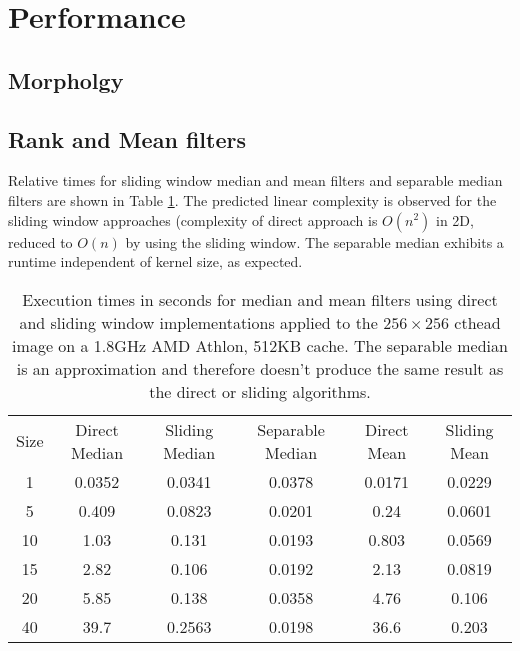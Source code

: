 \documentclass{InsightArticle}
\begin{document}
\section{Performance}
\subsection{Morpholgy}


\subsection{Rank and Mean filters}
Relative times for sliding window median and mean filters and
separable median filters are shown in Table \ref{tab:perfRank}. The
predicted linear complexity is observed for the sliding window
approaches (complexity of direct approach is $O(n^2)$ in 2D, reduced
to $O(n)$ by using the sliding window. The separable median exhibits a
runtime independent of kernel size, as expected.
\begin{table}[htbp]
\centering
\begin{tabular}{cccccc}
\hline
Size  &  Direct Median &  Sliding Median & Separable Median & Direct Mean & Sliding Mean\\
1     &   0.0352 & 0.0341 & 0.0378 & 0.0171 & 0.0229\\
5     &   0.409  & 0.0823  & 0.0201 & 0.24  &  0.0601 \\
10    &   1.03   & 0.131 & 0.0193 & 0.803 &  0.0569 \\
15    &   2.82   & 0.106  & 0.0192 & 2.13  &  0.0819 \\
20    &   5.85   & 0.138  & 0.0358 & 4.76  &  0.106 \\
40    &   39.7   & 0.2563  & 0.0198 & 36.6  &  0.203 \\
\hline
\hline
\end{tabular}
\caption{Execution times in seconds for median and mean filters using direct and sliding window implementations applied to the $256 \times 256$ cthead image on a 1.8GHz AMD Athlon, 512KB cache. The separable median is an approximation and therefore doesn't produce the same result as the direct or sliding algorithms.\label{tab:perfRank}}
\end{table}
\end{document}
